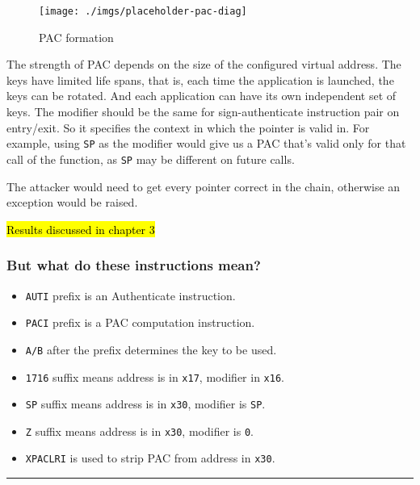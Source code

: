 \documentclass[a4paper, nobind]{templates/ociamthesis}
\providecommand{\tightlist}{%
  \setlength{\itemsep}{0pt}\setlength{\parskip}{0pt}}
\begin{document}
\begin{figure}

{\centering \texttt{[image: ./imgs/placeholder-pac-diag]} 

}

\caption{PAC formation}\label{fig:pac-diag}
\end{figure}

The strength of PAC depends on the size of the configured virtual address.
The keys have limited life spans, that is, each time the application is launched, the keys can be rotated.
And each application can have its own independent set of keys.
The modifier should be the same for sign-authenticate instruction pair on entry/exit.
So it specifies the context in which the pointer is valid in. For example,
using \texttt{SP} as the modifier would give us a PAC that's valid only for that call of the function,
as \texttt{SP} may be different on future calls.

The attacker would need to get every pointer correct in the chain, otherwise an
exception would be raised.

\hl{Results discussed in chapter 3}

\subsubsection{But what do these instructions mean?}\label{but-what-do-these-instructions-mean}

\begin{itemize}
\tightlist
\item
  \texttt{AUTI} prefix is an Authenticate instruction.
\item
  \texttt{PACI} prefix is a PAC computation instruction.
\item
  \texttt{A/B} after the prefix determines the key to be used.
\item
  \texttt{1716} suffix means address is in \texttt{x17}, modifier in \texttt{x16}.
\item
  \texttt{SP} suffix means address is in \texttt{x30}, modifier is \texttt{SP}.
\item
  \texttt{Z} suffix means address is in \texttt{x30}, modifier is \texttt{0}.
\item
  \texttt{XPACLRI} is used to strip PAC from address in \texttt{x30}.
\end{itemize}

\begin{center}\rule{0.5\linewidth}{0.5pt}\end{center}
\end{document}
